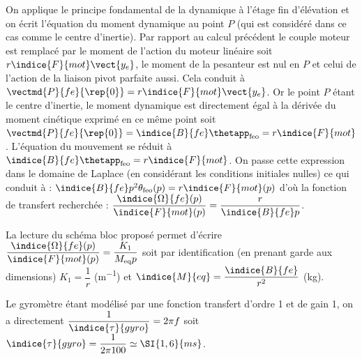 \question{}
\ifprof
\begin{corrige}
On applique le principe fondamental de la dynamique à l'étage fin d'élévation et on écrit l'équation du moment dynamique au point $P$ 
(qui est considéré dans ce cas comme le centre d'inertie). 
Par rapport au calcul précédent le couple moteur est remplacé par le moment de l'action du moteur linéaire soit  $r\indice{F}{mot} \vect{y_e}$, 
le moment de la pesanteur est nul en $P$ et celui de l'action de la liaison pivot parfaite aussi. 
Cela conduit à  
$\vectmd{P}{fe}{\rep{0}}=r\indice{F}{mot} \vect{y_e}$.  
Or le point $P$ étant le centre d'inertie, le moment dynamique est directement égal à la dérivée du moment cinétique exprimé en ce même point soit  $\vectmd{P}{fe}{\rep{0}} = \indice{B}{fe}\thetapp_{\text{feo}}=r\indice{F}{mot}$.
L'équation du mouvement se réduit à  $\indice{B}{fe}\thetapp_{\text{feo}}=r\indice{F}{mot}$. On passe cette expression dans le domaine de Laplace (en considérant les conditions initiales nulles) ce qui conduit à : $\indice{B}{fe} p^2 \theta_{\text{feo}}(p)=r\indice{F}{mot}(p)$ 
 d'où la fonction de transfert recherchée :  $\dfrac{\indice{\Omega}{fe}(p)}{\indice{F}{mot}(p)} = \dfrac{r}{\indice{B}{fe} p}$.

La lecture du schéma bloc proposé permet d'écrire   $\dfrac{\indice{\Omega}{fe}(p)}{\indice{F}{mot}(p)} = \dfrac{K_1}{M_{\text{eq}} p}$  soit par identification (en prenant garde aux dimensions)  $K_1 = \dfrac{1}{r}$ (\si{m^{-1}}) et  $\indice{M}{eq} = \dfrac{\indice{B}{fe}}{r^2}$ (\si{kg}).


\end{corrige}
\else
\fi

\question{}
\ifprof
\begin{corrige}
Le gyromètre étant modélisé par une fonction transfert d'ordre 1 et de gain 1, on a directement $\dfrac{1}{\indice{\tau}{gyro}}={2\pi f}$ soit $\indice{\tau}{gyro} = \dfrac{1}{2 \pi 100} \simeq \SI{1,6}{ms}$.
\end{corrige}
\else
\fi

